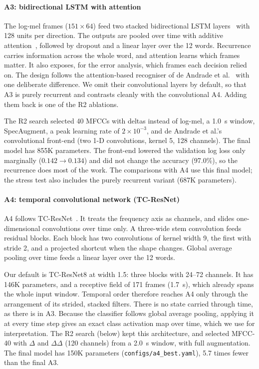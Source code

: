 \paragraph{A3: bidirectional LSTM with attention}
The log-mel frames ($151\times64$) feed two stacked bidirectional LSTM layers~\cite{hochreiter1997long,graves2013speech}
with 128 units per direction. The outputs are pooled over time with additive attention~\cite{bahdanau2015neural},
followed by dropout and a linear layer over the 12 words. Recurrence carries information across the whole word, and
attention learns which frames matter. It also exposes, for the error analysis, which frames each decision relied on.
The design follows the attention-based recogniser of de Andrade et al.~\cite{deandrade2018neural} with one
deliberate difference. We omit their convolutional layers by default, so that A3 is purely recurrent and contrasts
cleanly with the convolutional A4. Adding them back is one of the R2 ablations.

The R2 search selected 40 MFCCs with deltas instead of log-mel, a 1.0~s window, SpecAugment, a peak learning rate of $2\times10^{-3}$, and de Andrade et al.'s convolutional front-end (two 1-D convolutions, kernel 5, 128 channels).
The final model has 855K parameters. The front-end lowered the validation log loss only marginally ($0.142\to0.134$)
and did not change the accuracy (97.0\%), so the recurrence does most of the work. The comparisons with A4 use this
final model; the stress test also includes the purely recurrent variant (687K parameters).

\paragraph{A4: temporal convolutional network (TC-ResNet)}
A4 follows TC-ResNet~\cite{choi2019temporal}. It treats the frequency axis as channels, and slides
one-dimensional convolutions over time only. A three-wide stem convolution feeds residual blocks. Each block has two
convolutions of kernel width 9, the first with stride 2, and a projected shortcut when the shape changes. Global
average pooling over time feeds a linear layer over the 12 words.

Our default is TC-ResNet8 at width 1.5: three blocks with 24--72 channels. It has 146K parameters, and a receptive
field of 171 frames (1.7~s), which already spans the whole input window. Temporal order therefore reaches A4 only
through the arrangement of its strided, stacked filters. There is no state carried through time, as there is in A3.
Because the classifier follows global average pooling, applying it at every time step gives an exact class
activation map over time, which we use for interpretation. The R2 search (below) kept this architecture, and
selected MFCC-40 with $\Delta$ and $\Delta\Delta$ (120 channels) from a 2.0~s window, with full augmentation. The
final model has 150K parameters (\texttt{configs/a4\_best.yaml}), 5.7 times fewer than the final A3.

